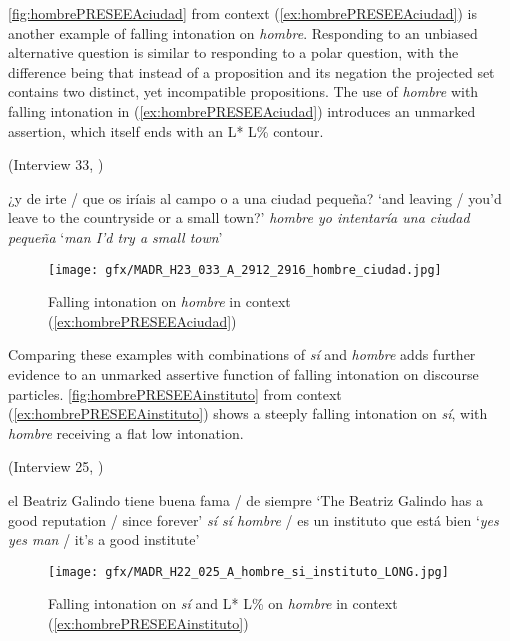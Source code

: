 \autoref{fig:hombrePRESEEAciudad} from context (\ref{ex:hombrePRESEEAciudad}) is another example of falling intonation on \textit{hombre}. Responding to an unbiased alternative question is si\-mi\-lar to responding to a polar question, with the difference being that instead of a proposition and its negation the projected set contains two distinct, yet incompatible propositions. The use of \textit{hombre} with falling intonation in (\ref{ex:hombrePRESEEAciudad}) introduces an unmarked assertion, which itself ends with an L* L\% contour.

\begin{exe}
	\ex (Interview 33, \cite{PRESEEA.20142020})\label{ex:hombrePRESEEAciudad}
	\begin{xlist}[A:]
	 ¿y de irte / que os iríais al campo o a una ciudad pequeña? 
	\glt `and leaving / you'd leave to the countryside or a small town?'
	 \textit{hombre yo intentaría una ciudad pequeña}
	\glt `\textit{man I'd try a small town}' 
	\end{xlist}
\end{exe}

\begin{figure}
	\texttt{[image: gfx/MADR\_H23\_033\_A\_2912\_2916\_hombre\_ciudad.jpg]}
	\caption{Falling intonation on \textit{hombre} in context (\ref{ex:hombrePRESEEAciudad}) \href{https://osf.io/n7g4c/}{\faVolumeUp} \label{fig:hombrePRESEEAciudad}}
\end{figure}

Comparing these examples with combinations of \textit{sí} and \textit{hombre} adds further evidence to an unmarked assertive function of falling intonation on discourse particles. \autoref{fig:hombrePRESEEAinstituto} from context (\ref{ex:hombrePRESEEAinstituto}) shows a steeply falling intonation on \textit{sí}, with \textit{hombre} receiving a flat low intonation.\pagebreak

\begin{exe}
	\ex (Interview 25, \cite{PRESEEA.20142020})\label{ex:hombrePRESEEAinstituto}
	\begin{xlist}[A:]
	  el Beatriz Galindo tiene buena fama / de siempre 
	\glt `The Beatriz Galindo has a good reputation / since forever' 
	 \textit{sí sí hombre} / es un instituto que está bien 
	\glt `\textit{yes yes man} / it's a good institute'
	\end{xlist}
\end{exe}

\begin{figure}
	\texttt{[image: gfx/MADR\_H22\_025\_A\_hombre\_si\_instituto\_LONG.jpg]}
	\caption[Falling intonation on \textit{sí} and L* L\% on \textit{hombre} in context (\ref{ex:hombrePRESEEAinstituto})]{Falling intonation on \textit{sí} and L* L\% on \textit{hombre} in context (\ref{ex:hombrePRESEEAinstituto}) \href{https://osf.io/qbnc6/}{\faVolumeUp} \label{fig:hombrePRESEEAinstituto}}
\end{figure}

